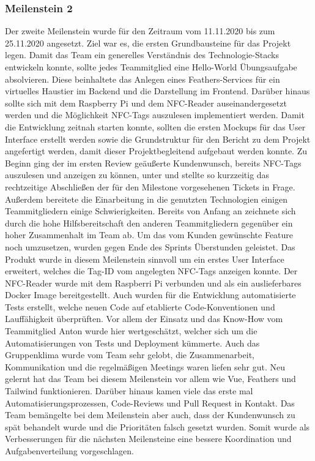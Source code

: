\documentclass[10pt, a4paper]{article}
\begin{document}
\subsubsection*{Meilenstein 2}
Der zweite Meilenstein wurde für den Zeitraum vom 11.11.2020 bis zum 25.11.2020 angesetzt.
Ziel war es, die ersten Grundbausteine für das Projekt legen.
Damit das Team ein generelles Verständnis des Technologie-Stacks entwickeln konnte, sollte jedes Teammitglied eine \glqq Hello-World\grqq{} Übungsaufgabe absolvieren.
Diese beinhaltete das Anlegen eines Feathers-Services für ein virtuelles Haustier im Backend und die Darstellung im Frontend.
Darüber hinaus sollte sich mit dem Raspberry Pi und dem NFC-Reader auseinandergesetzt werden und die Möglichkeit NFC-Tags auszulesen implementiert werden.
Damit die Entwicklung zeitnah starten konnte, sollten die ersten Mockups für das User Interface erstellt werden sowie die Grundstruktur für den Bericht zu dem Projekt angefertigt werden, damit dieser Projektbegleitend aufgebaut werden konnte.
Zu Beginn ging der im ersten Review geäußerte Kundenwunsch, bereits NFC-Tags auszulesen und anzeigen zu können, unter und stellte so kurzzeitig das rechtzeitige Abschließen der für den Milestone vorgesehenen Tickets in Frage.
Außerdem bereitete die Einarbeitung in die genutzten Technologien einigen Teammitgliedern einige Schwierigkeiten.
Bereits von Anfang an zeichnete sich durch die hohe Hilfsbereitschaft den anderen Teammitgliedern gegenüber ein hoher Zusammenhalt im Team ab.
Um das vom Kunden gewünschte Feature noch umzusetzen, wurden gegen Ende des Sprints Überstunden geleistet.
Das Produkt wurde in diesem Meilenstein sinnvoll um ein erstes User Interface erweitert, welches die Tag-ID vom angelegten NFC-Tags anzeigen konnte.
Der NFC-Reader wurde mit dem Raspberri Pi verbunden und als ein auslieferbares Docker Image bereitgestellt.
Auch wurden für die Entwicklung automatisierte Tests erstellt, welche neuen Code auf etablierte Code-Konventionen und Lauffähigkeit überprüften.
Vor allem der Einsatz und das Know-How vom Teammitglied Anton wurde hier wertgeschätzt, welcher sich um die Automatisierungen von Tests und Deployment kümmerte.
Auch das Gruppenklima wurde vom Team sehr gelobt, die Zusammenarbeit, Kommunikation und die regelmäßigen Meetings waren liefen sehr gut.
Neu gelernt hat das Team bei diesem Meilenstein vor allem wie Vue, Feathers und Tailwind funktionieren.
Darüber hinaus kamen viele das erste mal Automatisierungsprozessen, Code-Reviews und Pull Request in Kontakt.
Das Team bemängelte bei dem Meilenstein aber auch, dass der Kundenwunsch zu spät behandelt wurde und die Prioritäten falsch gesetzt wurden.
Somit wurde als Verbesserungen für die nächsten Meilensteine eine bessere Koordination und Aufgabenverteilung vorgeschlagen.
\end{document}
